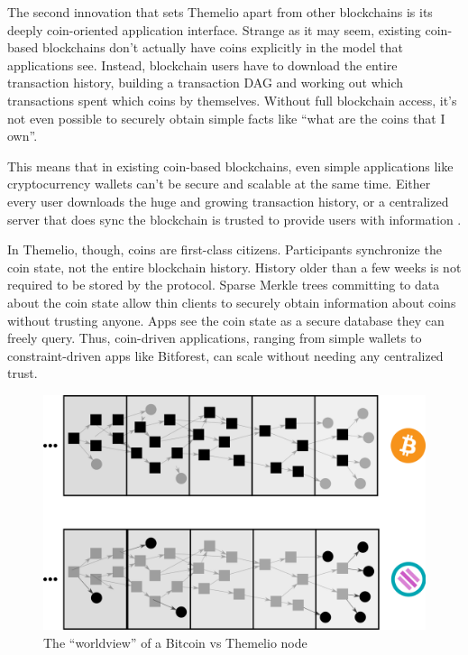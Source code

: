 \documentclass[]{article}
\begin{document}
The second innovation that sets Themelio apart from other blockchains is
its deeply coin-oriented application interface. Strange as it may seem,
existing coin-based blockchains don't actually have coins explicitly in
the model that applications see. Instead, blockchain users have to
download the entire transaction history, building a transaction DAG and
working out which transactions spent which coins by themselves. Without
full blockchain access, it's not even possible to securely obtain simple
facts like ``what are the coins that I own''.

This means that in existing coin-based blockchains, even simple
applications like cryptocurrency wallets can't be secure and scalable at
the same time. Either every user downloads the huge and growing
transaction history, or a centralized server that does sync the
blockchain is trusted to provide users with information .

In Themelio, though, coins are first-class citizens. Participants
synchronize the coin state, not the entire blockchain history. History
older than a few weeks is not required to be stored by the protocol.
Sparse Merkle trees committing to data about the coin state allow thin
clients to securely obtain information about coins without trusting
anyone. Apps see the coin state as a secure database they can freely
query. Thus, coin-driven applications, ranging from simple wallets to
constraint-driven apps like Bitforest, can scale without needing any
centralized trust.

\begin{figure}
\centering
\includegraphics{../.gitbook/assets/coinint-eps-converted-to.png}
\caption{The ``worldview'' of a Bitcoin vs Themelio node}
\end{figure}
\end{document}

